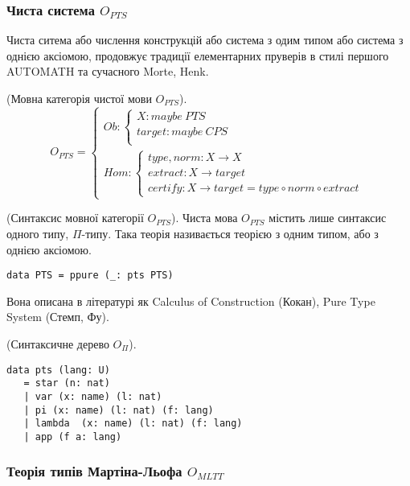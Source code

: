 \begin{definition}
\newpage

\subsubsection{Чиста система $O_{PTS}$}

Чиста ситема або числення конструкцій або система з одим типом або
система з однією аксіомою, продовжує традиції елементарних пруверів
в стилі першого AUTOMATH та сучасного Morte, Henk.

\begin{definition} (Мовна категорія чистої мови $O_{PTS}$).
$$
O_{PTS} =
\begin{cases}
Ob: \begin{cases}
X: maybe\ PTS \\
target: maybe\ CPS \\
\end{cases} \\
Hom: \begin{cases}
type,norm: X \rightarrow X \\
extract: X \rightarrow target \\
certify: X \rightarrow target = type \circ norm \circ extract
\end{cases}
\end{cases}
$$
\end{definition}

\begin{definition} (Синтаксис мовної категорії $O_{PTS}$).
Чиста мова $O_{PTS}$ містить лише синтаксис одного типу, $\Pi$-типу.
Така теорія називається теорією з одним типом, або з однією аксіомою.
\begin{lstlisting}[mathescape=true]
data PTS = ppure (_: pts PTS)
\end{lstlisting}
\end{definition}

Вона описана в літературі як Calculus of Construction (Кокан),
Pure Type System (Стемп, Фу).

\begin{definition} (Синтаксичне дерево $O_\Pi$).
\begin{lstlisting}[mathescape=true]
data pts (lang: U)
   = star (n: nat)
   | var (x: name) (l: nat)
   | pi (x: name) (l: nat) (f: lang)
   | lambda  (x: name) (l: nat) (f: lang)
   | app (f a: lang)
\end{lstlisting}
\end{definition}

\newpage
\subsubsection{Теорія типів Мартіна-Льофа $O_{MLTT}$}


\end{definition}
